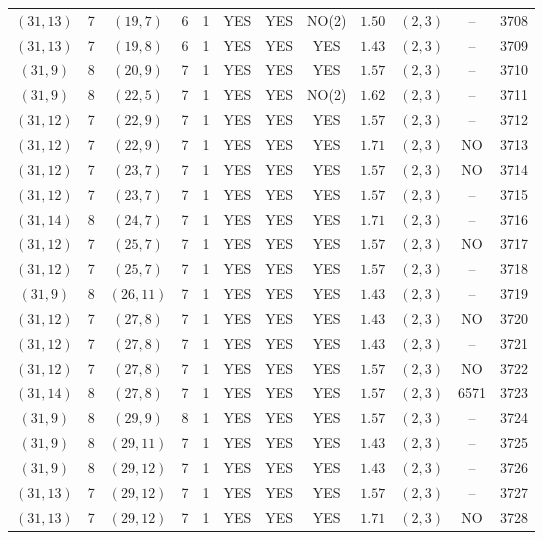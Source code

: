 \begin{longtable}{|c|c|c|c|c|c|c|c|c|c|c|c|}
$(31,13)$ & 7 & $(19,7)$ & 6 & 1 & YES & YES & NO(2) & $1.50$ & $(2,3)$ & -- & 3708\\
$(31,13)$ & 7 & $(19,8)$ & 6 & 1 & YES & YES & YES & $1.43$ & $(2,3)$ & -- & 3709\\
$(31,9)$ & 8 & $(20,9)$ & 7 & 1 & YES & YES & YES & $1.57$ & $(2,3)$ & -- & 3710\\
$(31,9)$ & 8 & $(22,5)$ & 7 & 1 & YES & YES & NO(2) & $1.62$ & $(2,3)$ & -- & 3711\\
$(31,12)$ & 7 & $(22,9)$ & 7 & 1 & YES & YES & YES & $1.57$ & $(2,3)$ & -- & 3712\\
$(31,12)$ & 7 & $(22,9)$ & 7 & 1 & YES & YES & YES & $1.71$ & $(2,3)$ & NO & 3713\\
$(31,12)$ & 7 & $(23,7)$ & 7 & 1 & YES & YES & YES & $1.57$ & $(2,3)$ & NO & 3714\\
$(31,12)$ & 7 & $(23,7)$ & 7 & 1 & YES & YES & YES & $1.57$ & $(2,3)$ & -- & 3715\\
$(31,14)$ & 8 & $(24,7)$ & 7 & 1 & YES & YES & YES & $1.71$ & $(2,3)$ & -- & 3716\\
$(31,12)$ & 7 & $(25,7)$ & 7 & 1 & YES & YES & YES & $1.57$ & $(2,3)$ & NO & 3717\\
$(31,12)$ & 7 & $(25,7)$ & 7 & 1 & YES & YES & YES & $1.57$ & $(2,3)$ & -- & 3718\\
$(31,9)$ & 8 & $(26,11)$ & 7 & 1 & YES & YES & YES & $1.43$ & $(2,3)$ & -- & 3719\\
$(31,12)$ & 7 & $(27,8)$ & 7 & 1 & YES & YES & YES & $1.43$ & $(2,3)$ & NO & 3720\\
$(31,12)$ & 7 & $(27,8)$ & 7 & 1 & YES & YES & YES & $1.43$ & $(2,3)$ & -- & 3721\\
$(31,12)$ & 7 & $(27,8)$ & 7 & 1 & YES & YES & YES & $1.57$ & $(2,3)$ & NO & 3722\\
$(31,14)$ & 8 & $(27,8)$ & 7 & 1 & YES & YES & YES & $1.57$ & $(2,3)$ & 6571 & 3723\\
$(31,9)$ & 8 & $(29,9)$ & 8 & 1 & YES & YES & YES & $1.57$ & $(2,3)$ & -- & 3724\\
$(31,9)$ & 8 & $(29,11)$ & 7 & 1 & YES & YES & YES & $1.43$ & $(2,3)$ & -- & 3725\\
$(31,9)$ & 8 & $(29,12)$ & 7 & 1 & YES & YES & YES & $1.43$ & $(2,3)$ & -- & 3726\\
$(31,13)$ & 7 & $(29,12)$ & 7 & 1 & YES & YES & YES & $1.57$ & $(2,3)$ & -- & 3727\\
$(31,13)$ & 7 & $(29,12)$ & 7 & 1 & YES & YES & YES & $1.71$ & $(2,3)$ & NO & 3728\\

\end{longtable}
